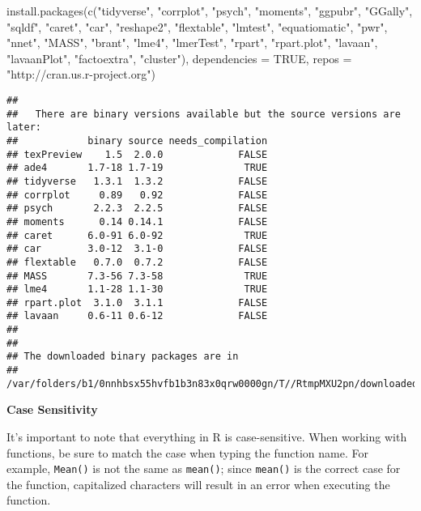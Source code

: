 \documentclass[
]{book}
\newenvironment{Shaded}{\begin{snugshade}}{\end{snugshade}}
\newcommand{\AttributeTok}[1]{\textcolor[rgb]{0.77,0.63,0.00}{#1}}
\newcommand{\ConstantTok}[1]{\textcolor[rgb]{0.00,0.00,0.00}{#1}}
\newcommand{\FunctionTok}[1]{\textcolor[rgb]{0.00,0.00,0.00}{#1}}
\newcommand{\NormalTok}[1]{#1}
\newcommand{\StringTok}[1]{\textcolor[rgb]{0.31,0.60,0.02}{#1}}
\begin{document}
\begin{Shaded}
\begin{Highlighting}[]
\FunctionTok{install.packages}\NormalTok{(}\FunctionTok{c}\NormalTok{(}\StringTok{"tidyverse"}\NormalTok{, }\StringTok{"corrplot"}\NormalTok{, }\StringTok{"psych"}\NormalTok{, }\StringTok{"moments"}\NormalTok{, }\StringTok{"ggpubr"}\NormalTok{, }\StringTok{"GGally"}\NormalTok{, }\StringTok{"sqldf"}\NormalTok{, }\StringTok{"caret"}\NormalTok{, }\StringTok{"car"}\NormalTok{, }\StringTok{"reshape2"}\NormalTok{, }\StringTok{"flextable"}\NormalTok{, }\StringTok{"lmtest"}\NormalTok{, }\StringTok{"equatiomatic"}\NormalTok{, }\StringTok{"pwr"}\NormalTok{, }\StringTok{"nnet"}\NormalTok{, }\StringTok{"MASS"}\NormalTok{, }\StringTok{"brant"}\NormalTok{, }\StringTok{"lme4"}\NormalTok{, }\StringTok{"lmerTest"}\NormalTok{, }\StringTok{"rpart"}\NormalTok{, }\StringTok{"rpart.plot"}\NormalTok{, }\StringTok{"lavaan"}\NormalTok{, }\StringTok{"lavaanPlot"}\NormalTok{, }\StringTok{"factoextra"}\NormalTok{, }\StringTok{"cluster"}\NormalTok{), }\AttributeTok{dependencies =} \ConstantTok{TRUE}\NormalTok{, }\AttributeTok{repos =} \StringTok{"http://cran.us.r{-}project.org"}\NormalTok{)}
\end{Highlighting}
\end{Shaded}

\begin{verbatim}
## 
##   There are binary versions available but the source versions are later:
##            binary source needs_compilation
## texPreview    1.5  2.0.0             FALSE
## ade4       1.7-18 1.7-19              TRUE
## tidyverse   1.3.1  1.3.2             FALSE
## corrplot     0.89   0.92             FALSE
## psych       2.2.3  2.2.5             FALSE
## moments      0.14 0.14.1             FALSE
## caret      6.0-91 6.0-92              TRUE
## car        3.0-12  3.1-0             FALSE
## flextable   0.7.0  0.7.2             FALSE
## MASS       7.3-56 7.3-58              TRUE
## lme4       1.1-28 1.1-30              TRUE
## rpart.plot  3.1.0  3.1.1             FALSE
## lavaan     0.6-11 0.6-12             FALSE
## 
## 
## The downloaded binary packages are in
##  /var/folders/b1/0nnhbsx55hvfb1b3n83x0qrw0000gn/T//RtmpMXU2pn/downloaded_packages
\end{verbatim}

\textbf{Case Sensitivity}

It's important to note that everything in R is case-sensitive. When working with functions, be sure to match the case when typing the function name. For example, \texttt{Mean()} is not the same as \texttt{mean()}; since \texttt{mean()} is the correct case for the function, capitalized characters will result in an error when executing the function.
\end{document}
